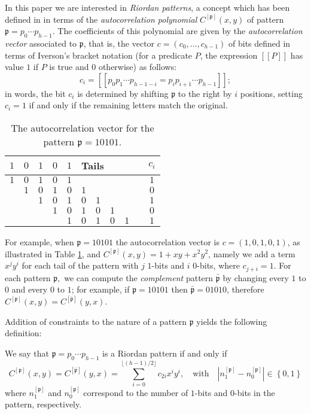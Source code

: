In this paper we are interested in \textit{Riordan patterns}, a concept which
has been defined in \citep{MERLINI20112988} in terms of the \textit{autocorrelation
polynomial} $C^{[\mathfrak{p}]}(x,y)$ of pattern $\mathfrak{p}=p_{0}\cdots
p_{h-1}$. The coefficients of this polynomial are given by the
\textit{autocorrelation vector} associated to $\mathfrak{p}$, that is, the
vector $c=(c_0,\ldots ,c_{h-1})$ of bits defined in terms of Iverson's bracket
notation (for a predicate $P$, the expression $[\![P]\!]$ has value $1$ if $P$
is true and $0$ otherwise) as follows:
$$c_i=[\![p_0p_1\cdots p_{h-1-i}=p_{i}p_{i+1}\cdots p_{h-1}]\!];$$
in words, the bit $c_i$ is determined by shifting $\mathfrak{p}$ to the right by
$i$ positions, setting $c_i=1$ if and only if the remaining letters match the
original. 
\begin{table}
    \begin{center}
        \begin{tabular}{ccccc|cccccc}
          $1$ & $0$ & $1$ & $0$& $1$ &   \multicolumn{5}{l}{Tails} & $c_{i}$  \\
          \hline
          $1$ & $0$ & $1$ & $0$ & $1$ & &   &   &   &    &    $1$ \\
            & $1$ & $0$ & $1$ & $0$ & $1$ &  &   &   &   &    $0$ \\
            &   & $1$ & $0$ & $1$ & $0$ & $1$ &  &   &   &    $1$ \\
            &   &   & $1$ & $0$ & $1$ & $0$ & $1$ &  &   &    $0$ \\
            &   &   &   & $1$ & $0$ & $1$ & $0$ & $1$ &  &    $1$ \\
        \end{tabular}
    \end{center}
\caption{\label{auto}The autocorrelation vector for the pattern $\mathfrak{p}= 10101$.}
\end{table}
For example, when $\mathfrak{p}= 10101$ the autocorrelation vector is
$c=(1,0,1,0,1)$, as illustrated in Table \ref{auto}, and
$C^{[\mathfrak{p}]}(x,y)=1+xy+x^2y^2$, namely we add a term $x^jy^i$ for each
tail of the pattern with $j$ $1$-bits  and $i$ $0$-bits, where $c_{j+i}=1$.
For each pattern $\mathfrak{p},$  we can compute the \textit{complement} pattern
$\mathfrak{\bar{p}}$  by changing every $1$ to $0$ and every $0$ to $1$; for
example, if $\mathfrak{p}= 10101$ then $\mathfrak{\bar{p}}=01010$, therefore
$C^{[\mathfrak{p}]}(x,y)=C^{[\mathfrak{\bar{p}}]}(y,x)$.

Addition of constraints to the nature of a pattern $\mathfrak{p}$ yields
the following definition:
\begin{defi}
\label{defrp}
We say that $\mathfrak{p}=p_0\cdots p_{h-1}$ is a Riordan pattern if and only
if
\begin{displaymath}
C^{[\mathfrak{p}]}(x,y)=C^{[\mathfrak{\bar{p}}]}(y,x)=\sum_{i=0}^{\lfloor(h-1)/2\rfloor}c_{2i}x^iy^i,
\quad \mbox{with} \quad |n_1^{[\mathfrak{p}]}-n_0^{[\mathfrak{p}]}|\in
\left\{0,1 \right\}
\end{displaymath}
where $n_1^{[\mathfrak{p}]}$ and  $n_0^{[\mathfrak{p}]}$ correspond to the
number of $1$-bits  and $0$-bits  in the pattern, respectively.
\end{defi}

